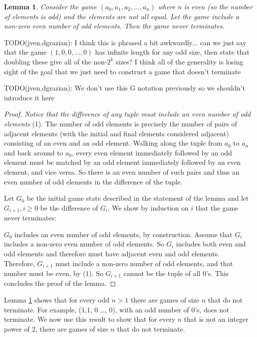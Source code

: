 \documentclass[12pt]{amsart}
\newtheorem{lemma}[theorem]{Lemma}
\begin{document}
\begin{lemma}
Consider the game $(a_0, a_1, a_2, \ldots, a_n)$ where n is even (so the number of elements is odd) and the elements are not all equal. Let the game include a non-zero even number of odd elements. Then the game never terminates.
\label{lem:evenodds}
\end{lemma}

TODO(jven,dgrazian): I think this is phrased a bit awkwardly... can we just say that the game $(1,0,0,...,0)$ has infinite length for any odd size, then state that doubling these give all of the non-$2^k$ sizes? I think all of the generality is losing sight of the goal that we just need to construct a game that doesn't terminate

TODO(jven,dgrazian): We don't use this G notation previously so we shouldn't introduce it here

\begin{proof}
\emph{Notice that the difference of any tuple must include an even number of odd elements} (1). The number of odd elements is precisely the number of pairs of adjacent elements (with the initial and final elements considered adjacent) consisting of an even and an odd element. Walking along the tuple from $a_0$ to $a_n$ and back around to $a_0$, every even element immediately followed by an odd element must be matched by an odd element immediately followed by an even element, and vice versa. So there is an even number of such pairs and thus an even number of odd elements in the difference of the tuple.

Let $G_0$ be the initial game state described in the statement of the lemma and let $G_{i+1}, i \geq 0$ be the difference of $G_i$. We show by induction on $i$ that the game never terminates:

$G_0$ includes an even number of odd elements, by construction. Assume that $G_i$ includes a non-zero even number of odd elements. So $G_i$ includes both even and odd elements and therefore must have adjacent even and odd elements. Therefore, $G_{i+1}$ must include a non-zero number of odd elements, and that number must be even, by (1). So $G_{i+1}$ cannot be the tuple of all $0$'s. This concludes the proof of the lemma.
\end{proof}

Lemma \ref{lem:evenodds} shows that for every odd $n > 1$ there are games of size $n$ that do not terminate. For example, (1,1, 0 \ldots, 0), with an odd number of 0's, does not terminate. We now use this result to show that for every $n$ that is not an integer power of 2, there are games of size $n$ that do not terminate.
\end{document}
